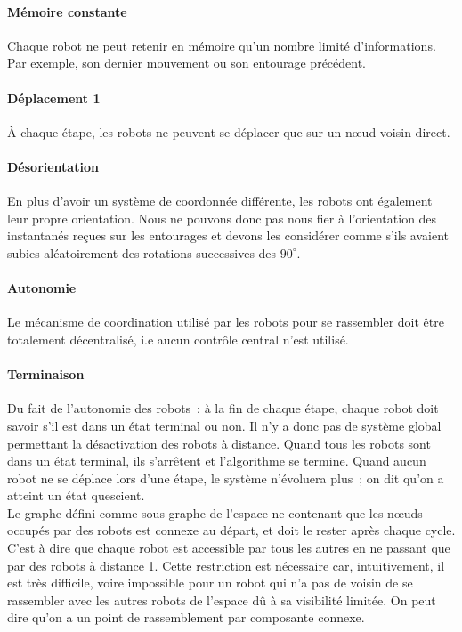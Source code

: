 \paragraph{Mémoire constante} Chaque robot ne peut retenir en mémoire qu'un
nombre limité d'informations. Par exemple, son dernier mouvement ou son
entourage précédent.

\paragraph{Déplacement 1} \`A chaque étape, les robots ne peuvent se déplacer que
sur un n\oe{}ud voisin direct.

\paragraph{Désorientation} En plus d'avoir un système de coordonnée différente,
les robots ont également leur propre orientation. Nous ne pouvons donc pas nous
fier à l'orientation des instantanés reçues sur les entourages et devons les
considérer comme s'ils avaient subies aléatoirement des rotations successives
des $90^{\circ}$.

\paragraph{Autonomie} Le mécanisme de coordination utilisé par les robots pour
se rassembler doit être totalement décentralisé, i.e aucun contrôle central
n'est utilisé.

\paragraph{Terminaison} Du fait de l'autonomie des robots~: à la fin de chaque
étape, chaque robot doit savoir s'il est dans un état terminal ou non. Il n'y a
donc pas de système global permettant la désactivation des robots à distance.
Quand tous les robots sont dans un état terminal, ils s'arrêtent et
l'algorithme se termine. Quand aucun robot ne se déplace lors d'une étape, le
système n'évoluera plus~; on dit qu'on a atteint un état quescient. \\

Le graphe défini comme sous graphe de l'espace ne contenant que les n\oe{}uds
occupés par des robots est connexe au départ, et doit le rester après chaque
cycle. C'est à dire que chaque robot est accessible par tous les autres en ne
passant que par des robots à distance 1. Cette restriction est nécessaire car,
intuitivement, il est très difficile, voire impossible pour un robot qui n'a
pas de voisin de se rassembler avec les autres robots de l'espace dû à sa
visibilité limitée. On peut dire qu'on a un point de rassemblement par
composante connexe.

